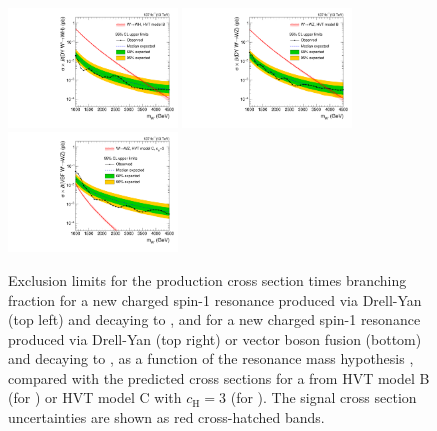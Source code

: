 \begin{figure}[htbp]
  \centering
  \includegraphics[width=0.4\textwidth]{fig/results/limits_WprToWH.pdf}
  \includegraphics[width=0.4\textwidth]{fig/results/limits_WprToWZ.pdf}\\
  \includegraphics[width=0.4\textwidth]{fig/results/limits_VBFWprToWZ.pdf}
  \caption{
    Exclusion limits for the production cross section times branching fraction for a new charged spin-1 resonance produced via Drell-Yan (top left) and decaying to \WH, and for a new charged spin-1 resonance produced via Drell-Yan (top right) or vector boson fusion (bottom) and decaying to \WZ, as a function of the resonance mass hypothesis \MX, compared with the predicted cross sections for a \Wpr from HVT model B (for \DY) or HVT model C with $c_\mathrm{H}=3$ (for \VBF).
    The signal cross section uncertainties are shown as red cross-hatched bands.
  }
  \label{fig:limits_spin1_char}
\end{figure}

